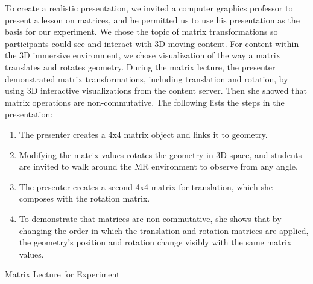 \documentclass[sigchi-a]{acmart}
\begin{document}

\begin{sidebar}
To create a realistic presentation, we invited a computer graphics professor to present a lesson on matrices, and he permitted us to use his presentation as the basis for our experiment.
We chose the topic of matrix transformations so participants could see and interact with 3D moving content. 
For content within the 3D immersive environment, we chose visualization of the way a matrix translates and rotates geometry. 
During the matrix lecture, the presenter demonstrated matrix transformations, including translation and rotation, by using 3D interactive visualizations from the content server. Then she showed that matrix operations are non-commutative.
The following lists the steps in the presentation:
\begin{enumerate}
  \item The presenter creates a 4x4 matrix object and links it to geometry. 
  \item Modifying the matrix values rotates the geometry in 3D space, and students are invited to walk around the MR environment to observe from any angle. 
  \item The presenter creates a second 4x4 matrix for translation, which she composes with the rotation matrix.
  \item To demonstrate that matrices are non-commutative, she shows that by changing the order in which the translation and rotation matrices are applied, the geometry's position and rotation change visibly with the same matrix values.
  \end{enumerate}
  \caption{Matrix Lecture for Experiment}
  \label{sidebar:matrix}
\end{sidebar}
\end{document}
